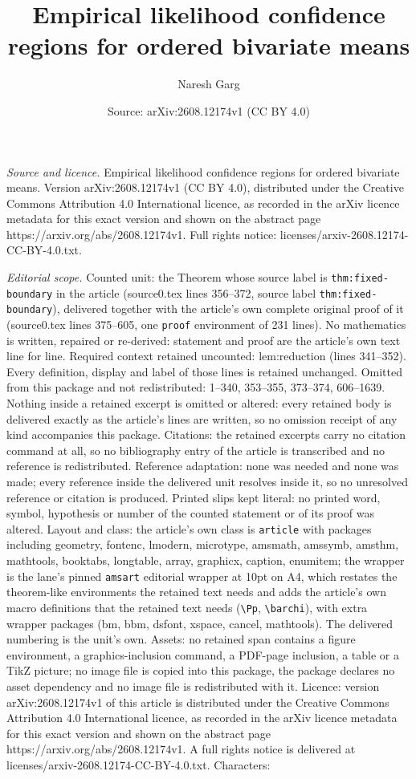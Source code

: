 \documentclass[10pt,a4paper]{amsart}
\title[Empirical likelihood confidence regions for ordered bivariat]{Empirical likelihood confidence regions for ordered bivariate means}
\author{Naresh Garg}
\date{Source: arXiv:2608.12174v1 (CC BY 4.0)}
\begin{document}
\maketitle

\noindent\emph{Source and licence.} Empirical likelihood confidence regions for ordered bivariate means. Version arXiv:2608.12174v1 (CC BY 4.0), distributed under the Creative Commons Attribution 4.0 International licence, as recorded in the arXiv licence metadata for this exact version and shown on the abstract page https://arxiv.org/abs/2608.12174v1. Full rights notice: licenses/arxiv-2608.12174-CC-BY-4.0.txt.\par\smallskip

\noindent\textit{Editorial scope.} Counted unit: the Theorem whose source label is \texttt{thm:fixed-boundary} in the article (source0.tex lines 356--372, source label \texttt{thm:fixed-boundary}), delivered together with the article's own complete original proof of it (source0.tex lines 375--605, one \texttt{proof} environment of 231 lines). No mathematics is written, repaired or re-derived: statement and proof are the article's own text line for line. Required context retained uncounted: lem:reduction (lines 341--352). Every definition, display and label of those lines is retained unchanged. Omitted from this package and not redistributed: 1--340, 353--355, 373--374, 606--1639. Nothing inside a retained excerpt is omitted or altered: every retained body is delivered exactly as the article's lines are written, so no omission receipt of any kind accompanies this package. Citations: the retained excerpts carry no citation command at all, so no bibliography entry of the article is transcribed and no reference is redistributed. Reference adaptation: none was needed and none was made; every reference inside the delivered unit resolves inside it, so no unresolved reference or citation is produced. Printed slips kept literal: no printed word, symbol, hypothesis or number of the counted statement or of its proof was altered. Layout and class: the article's own class is \texttt{article} with packages including geometry, fontenc, lmodern, microtype, amsmath, amssymb, amsthm, mathtools, booktabs, longtable, array, graphicx, caption, enumitem; the wrapper is the lane's pinned \texttt{amsart} editorial wrapper at 10pt on A4, which restates the theorem-like environments the retained text needs and adds the article's own macro definitions that the retained text needs (\texttt{\textbackslash Pp}, \texttt{\textbackslash barchi}), with extra wrapper packages (bm, bbm, dsfont, xspace, cancel, mathtools). The delivered numbering is the unit's own. Assets: no retained span contains a figure environment, a graphics-inclusion command, a PDF-page inclusion, a table or a TikZ picture; no image file is copied into this package, the package declares no asset dependency and no image file is redistributed with it. Licence: version arXiv:2608.12174v1 of this article is distributed under the Creative Commons Attribution 4.0 International licence, as recorded in the arXiv licence metadata for this exact version and shown on the abstract page https://arxiv.org/abs/2608.12174v1. A full rights notice is delivered at licenses/arxiv-2608.12174-CC-BY-4.0.txt. Characters: 
\end{document}
